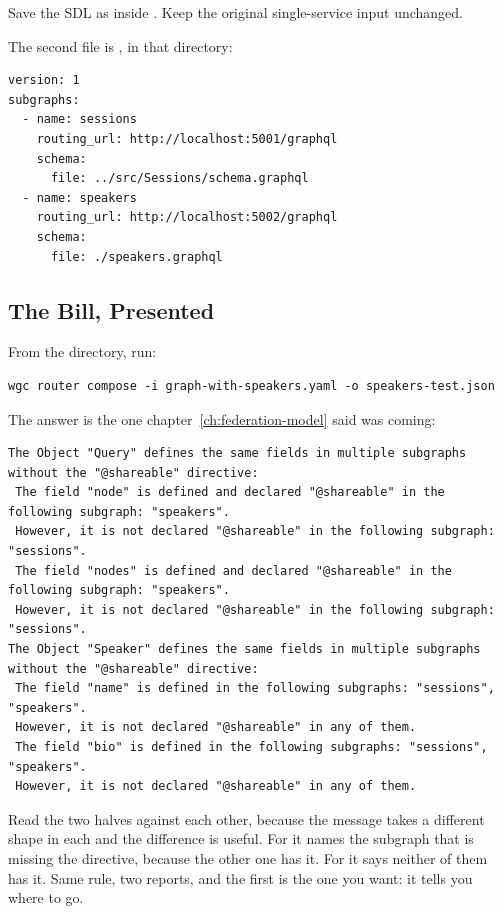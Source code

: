 %
Save the SDL as  inside .
Keep the original single-service input unchanged.

The second file is , in that directory:

\begin{verbatim}
version: 1
subgraphs:
  - name: sessions
    routing_url: http://localhost:5001/graphql
    schema:
      file: ../src/Sessions/schema.graphql
  - name: speakers
    routing_url: http://localhost:5002/graphql
    schema:
      file: ./speakers.graphql
\end{verbatim}

\subsection{The Bill, Presented}

%
From the  directory, run:

\begin{verbatim}
wgc router compose -i graph-with-speakers.yaml -o speakers-test.json
\end{verbatim}

The answer is the one chapter~\ref{ch:federation-model} said was coming:

\begin{verbatim}
The Object "Query" defines the same fields in multiple subgraphs without the "@shareable" directive:
 The field "node" is defined and declared "@shareable" in the following subgraph: "speakers".
 However, it is not declared "@shareable" in the following subgraph: "sessions".
 The field "nodes" is defined and declared "@shareable" in the following subgraph: "speakers".
 However, it is not declared "@shareable" in the following subgraph: "sessions".
The Object "Speaker" defines the same fields in multiple subgraphs without the "@shareable" directive:
 The field "name" is defined in the following subgraphs: "sessions", "speakers".
 However, it is not declared "@shareable" in any of them.
 The field "bio" is defined in the following subgraphs: "sessions", "speakers".
 However, it is not declared "@shareable" in any of them.
\end{verbatim}

%
Read the two halves against each other, because the message takes a different
shape in each and the difference is useful. For  it names the
subgraph that is missing the directive, because the other one has it. For
 it says neither of them has it. Same rule, two reports, and the
first is the one you want: it tells you where to go.

